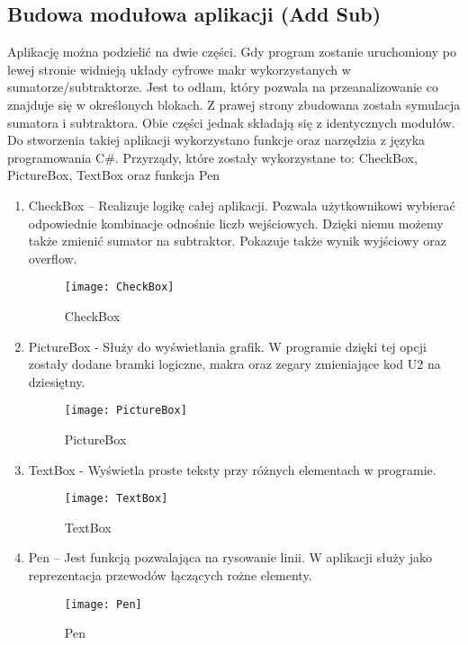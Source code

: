 \documentclass[12pt, a4paper, onside, polish]{article}				%
\begin{document}
\subsection{Budowa modułowa aplikacji (Add Sub)}
\hspace{\parindent}
Aplikację można podzielić na dwie części. Gdy program zostanie uruchomiony po lewej stronie widnieją układy cyfrowe makr wykorzystanych w sumatorze/subtraktorze. Jest to odłam, który pozwala na przeanalizowanie co znajduje się w określonych blokach. Z prawej strony zbudowana została symulacja sumatora i subtraktora. Obie części jednak składają się z identycznych modułów. Do stworzenia takiej aplikacji wykorzystano funkcje oraz narzędzia z języka programowania C\#. Przyrządy, które zostały wykorzystane to: CheckBox, PictureBox, TextBox oraz funkcja Pen  \newline\newline
 \begin{enumerate}
\item CheckBox – Realizuje logikę całej aplikacji. Pozwala użytkownikowi wybierać odpowiednie kombinacje odnośnie liczb wejściowych. Dzięki niemu możemy także zmienić sumator na subtraktor. Pokazuje także wynik wyjściowy oraz overflow. 
   	\begin{figure}[H]
  	  {\centering \texttt{[image: CheckBox]} \caption{CheckBox}}\vspace{5mm}
  	 \end{figure}
\item PictureBox - Służy do wyświetlania grafik. W programie dzięki tej opcji zostały dodane bramki logiczne, makra oraz zegary zmieniające kod U2 na dziesiętny.
   	\begin{figure}[H]
  	  {\centering \texttt{[image: PictureBox]} \caption{PictureBox}}\vspace{5mm}
  	 \end{figure}
\item TextBox - Wyświetla proste teksty przy różnych elementach w programie.  \newline
   	\begin{figure}[H]
  	  {\centering \texttt{[image: TextBox]} \caption{TextBox}}\vspace{5mm}
  	 \end{figure}
\item Pen – Jest funkcją pozwalająca na rysowanie linii. W aplikacji służy jako reprezentacja przewodów łączących rożne elementy.  
   	\begin{figure}[H]
  	  {\centering \texttt{[image: Pen]} \caption{Pen}}\vspace{5mm}
  	 \end{figure}
 \end{enumerate}
\end{document}
